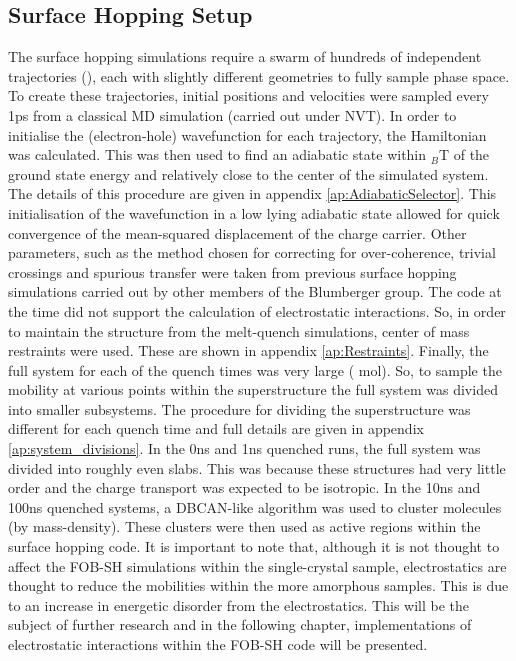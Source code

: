 \subsection{Surface Hopping Setup}
The surface hopping simulations require a swarm of hundreds of independent trajectories (), each with slightly different geometries to fully sample phase space. To create these trajectories, initial positions and velocities were sampled every 1ps from a classical MD simulation (carried out under NVT). In order to initialise the (electron-hole) wavefunction for each trajectory, the Hamiltonian was calculated. This was then used to find an adiabatic state within $_{B}$T of the ground state energy and relatively close to the center of the simulated system. The details of this procedure are given in appendix \ref{ap:AdiabaticSelector}. This initialisation of the wavefunction in a low lying adiabatic state allowed for quick convergence of the mean-squared displacement of the charge carrier. Other parameters, such as the method chosen for correcting for over-coherence, trivial crossings and spurious transfer were taken from previous surface hopping simulations carried out by other members of the Blumberger group. The code at the time did not support the calculation of electrostatic interactions. So, in order to maintain the structure from the melt-quench simulations, center of mass restraints were used. These are shown in appendix \ref{ap:Restraints}. Finally, the full system for each of the  quench times was very large ( mol). So, to sample the mobility at various points within the superstructure the full system was divided into smaller subsystems. The procedure for dividing the superstructure was different for each quench time and full details are given in appendix \ref{ap:system_divisions}. In the 0ns and 1ns quenched runs, the full system was divided into  roughly even slabs. This was because these structures had very little order and the charge transport was expected to be isotropic. In the 10ns and 100ns quenched systems, a DBCAN-like algorithm \cite{DBSCAN} was used to cluster molecules (by mass-density). These clusters were then used as active regions within the surface hopping code. It is important to note that, although it is not thought to affect the FOB-SH simulations within the single-crystal sample, electrostatics are thought to reduce the mobilities within the more amorphous samples. This is due to an increase in energetic disorder \cite{ESEffectOnMob} from the electrostatics. This will be the subject of further research and in the following chapter,  implementations of electrostatic interactions within the FOB-SH code will be presented.

